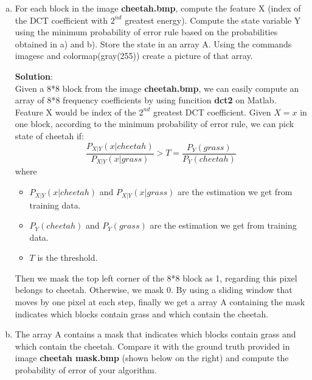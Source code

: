 \documentclass[12pt,letterpaper]{article}
\begin{document}
\begin{enumerate}[a)]
        \item    
        For each block in the image \textbf{cheetah.bmp}, compute the feature X (index of the DCT coefficient with $2^{nd}$ greatest energy).
        Compute the state variable Y using the minimum probability of error rule based on the probabilities obtained in a) and b).
        Store the state in an array A. Using the commands imagesc and colormap(gray(255)) create a picture of that array.
        
        \textbf{Solution}:\\
        Given a 8*8 block from the image \textbf{cheetah.bmp}, we can easily compute an array of 8*8 frequency coefficients by using
        funcition \textbf{dct2} on Matlab. Feature X would be index of the $2^{nd}$ greatest DCT coefficient. Given $X=x$ in one block,
        according to the minimum probability of error rule, we can pick state of cheetah if:
        \begin{equation}
            \frac{P_{X|Y}(x|cheetah)}{P_{X|Y}(x|grass)} > T = \frac{P_Y(grass)}{P_Y(cheetah)}
        \end{equation}
        where 
        \begin{itemize}
            \item[] $P_{X|Y}(x|cheetah)$ and $P_{X|Y}(x|grass)$ are the estimation we get from training data.
            \item[] $P_Y(cheetah)$ and $P_Y(grass)$ are the estimation we get from training data.
            \item[] $T$ is the threshold.
        \end{itemize}
        Then we mask the top left corner of the 8*8 block as 1, regarding this pixel belongs to cheetah.
        Otherwise, we mask 0. By using a sliding window that moves by one pixel at each step, finally we get a array A containing the mask indicates 
        which blocks contain grass and which contain the cheetah.

        \item  
        The array A contains a mask that indicates which blocks contain grass and which contain the cheetah. Compare it with the ground
        truth provided in image \textbf{cheetah mask.bmp} (shown below on the right) and compute the probability of error of your algorithm.
        

\end{enumerate}
\end{document}
